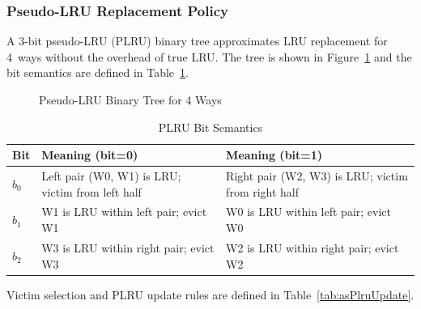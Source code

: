 \subsubsection{Pseudo-LRU Replacement Policy}
\label{subsec:plru}

A 3-bit pseudo-LRU (PLRU) binary tree approximates LRU replacement for
4~ways without the overhead of true LRU.
The tree is shown in Figure~\ref{fig:asPlru} and the bit semantics are
defined in Table~\ref{tab:asPlruBits}.

\begin{figure}[H]
\centering
{}
\caption{Pseudo-LRU Binary Tree for 4 Ways}
\label{fig:asPlru}
\end{figure}

\begin{table}[H]
\caption{PLRU Bit Semantics}
\label{tab:asPlruBits}
\centering
\begin{tabularx}{\textwidth}{|l |X |X|}
  \hline
  Bit & Meaning (bit=0) & Meaning (bit=1) \\
  \hline
  \hline
  $b_0$ & Left pair (W0, W1) is LRU; victim from left half & Right pair (W2, W3) is LRU; victim from right half \\
  \hline
  $b_1$ & W1 is LRU within left pair; evict W1 & W0 is LRU within left pair; evict W0 \\
  \hline
  $b_2$ & W3 is LRU within right pair; evict W3 & W2 is LRU within right pair; evict W2 \\
  \hline
\end{tabularx}
\end{table}

Victim selection and PLRU update rules are defined in Table~\ref{tab:asPlruUpdate}.


